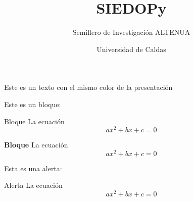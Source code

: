 \documentclass[12pt,letterpaper]{beamer}
\title{SIEDOPy}
\author{Semillero de Investigación ALTENUA}
\date{Universidad de Caldas}
\begin{document}
{
\begin{frame}
\end{frame}
}

{
	\begin{frame}
	\end{frame}
}
\begin{frame}
	\textcolor{azulp}{Este es un texto con el mismo color de la presentación}
	
	Este es un bloque:
	\begin{block}{Bloque}
		La ecuación
		\[
		ax^2+bx+c=0
		\]
	\end{block}
	
	\begin{block}{\textcolor{doradop}{\bf Bloque}}
		La ecuación
		\[
		ax^2+bx+c=0
		\]
	\end{block}

	Esta es una alerta:
	\begin{alertblock}{Alerta}
		La ecuación
		\[
		ax^2+bx+c=0
		\]
	\end{alertblock}
\end{frame}
\end{document}
